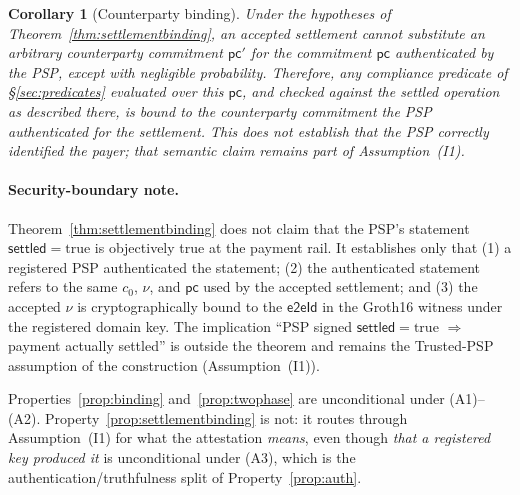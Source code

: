 \documentclass[11pt]{article}
\newtheorem{corollary}{Corollary}
\newcommand{\eeid}{\ensuremath{\mathsf{e2eId}}}
\begin{document}
\begin{corollary}[Counterparty binding]
\label{cor:counterparty}
Under the hypotheses of Theorem~\ref{thm:settlementbinding}, an accepted
settlement cannot substitute an arbitrary counterparty commitment
$\mathsf{pc}'$ for the commitment $\mathsf{pc}$ authenticated by the PSP, except
with negligible probability. Therefore, any compliance predicate of
\S\ref{sec:predicates} evaluated over this $\mathsf{pc}$, and checked against the
settled operation as described there, is bound to the counterparty commitment
the PSP authenticated for the settlement. This does not establish that the PSP
correctly identified the payer; that semantic claim remains part of
Assumption~(I1).
\end{corollary}

\paragraph{Security-boundary note.} Theorem~\ref{thm:settlementbinding} does
not claim that the PSP's statement $\mathsf{settled}=\mathrm{true}$ is
objectively true at the payment rail. It establishes only that (1) a registered
PSP authenticated the statement; (2) the authenticated statement refers to the
same $c_0$, $\nu$, and $\mathsf{pc}$ used by the accepted settlement; and (3) the
accepted $\nu$ is cryptographically bound to the \eeid{} in the Groth16 witness
under the registered domain key. The implication ``PSP signed
$\mathsf{settled}=\mathrm{true}$ $\Rightarrow$ payment actually settled'' is
outside the theorem and remains the Trusted-PSP assumption of the construction
(Assumption~(I1)).

\noindent Properties~\ref{prop:binding} and~\ref{prop:twophase} are
unconditional under (A1)--(A2). Property~\ref{prop:settlementbinding} is not: it
routes through Assumption~(I1) for what the attestation \emph{means}, even
though \emph{that a registered key produced it} is unconditional under (A3),
which is the authentication/truthfulness split of Property~\ref{prop:auth}.
\end{document}
